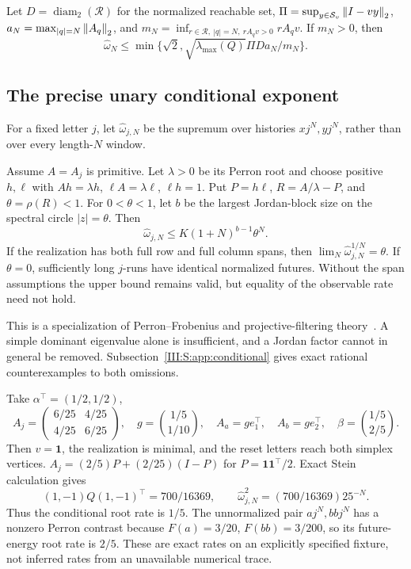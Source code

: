 \begin{proposition}
Let $D=\operatorname{diam}_2(\mathcal R)$ for the normalized reachable set, $\Pi=\sup_{y\in\mathcal S_v}\left\lVert I-vy\right\rVert_2$, $a_N=\max_{|q|=N}\left\lVert A_q\right\rVert_2$, and $m_N=\inf_{r\in\mathcal R,\ |q|=N,\ rA_qv>0}rA_qv$. If $m_N>0$, then
\[
 \widehat\omega_N\le\min\{\sqrt2,\sqrt{\lambda_{\max}(Q)}\Pi D a_N/m_N\}.
\]
\end{proposition}


\subsection{The precise unary conditional exponent}
For a fixed letter $j$, let $\widehat\omega_{j,N}$ be the supremum over histories $xj^N,yj^N$, rather than over every length-$N$ window.
\begin{theorem}\label{III:S:thm:perron}
Assume $A=A_j$ is primitive. Let $\lambda>0$ be its Perron root and choose positive $h,\ell$ with $Ah=\lambda h$, $\ell A=\lambda\ell$, $\ell h=1$. Put $P=h\ell$, $R=A/\lambda-P$, and $\theta=\rho(R)<1$. For $0<\theta<1$, let $b$ be the largest Jordan-block size on the spectral circle $|z|=\theta$. Then
\[
 \widehat\omega_{j,N}\le K(1+N)^{b-1}\theta^N.
\]
If the realization has both full row and full column spans, then
$\lim_N\widehat\omega_{j,N}^{1/N}=\theta$. If $\theta=0$, sufficiently long $j$-runs have identical normalized futures. Without the span assumptions the upper bound remains valid, but equality of the observable rate need not hold.
\end{theorem}

This is a specialization of Perron--Frobenius and projective-filtering theory~\cite{cohen,atar}. A simple dominant eigenvalue alone is insufficient, and a Jordan factor cannot in general be removed. Subsection~\ref{III:S:app:conditional} gives exact rational counterexamples to both omissions.

\begin{example}\label{III:S:ex:rates}
Take $\alpha^\top=(1/2,1/2)$,
\[
 A_j=\begin{pmatrix}6/25&4/25\\4/25&6/25\end{pmatrix},\quad
 g=\binom{1/5}{1/10},\quad A_a=ge_1^\top,\quad A_b=ge_2^\top,
 \quad\beta=\binom{1/5}{2/5}.
\]
Then $v=\mathbf1$, the realization is minimal, and the reset letters reach both simplex vertices. $A_j=(2/5)P+(2/25)(I-P)$ for $P=\mathbf1\mathbf1^\top/2$. Exact Stein calculation gives
\[
 (1,-1)Q(1,-1)^\top=700/16369,\qquad
 \widehat\omega_{j,N}^2=(700/16369)25^{-N}.
\]
Thus the conditional root rate is $1/5$. The unnormalized pair $aj^N,bbj^N$ has a nonzero Perron contrast because $F(a)=3/20$, $F(bb)=3/200$, so its future-energy root rate is $2/5$. These are exact rates on an explicitly specified fixture, not inferred rates from an unavailable numerical trace.
\end{example}

